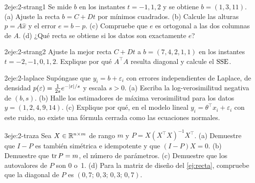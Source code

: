 \begin{ejercicio}{2}{eje:2-strang1}
Se mide $b$ en los instantes $t=-1,1,2$ y se obtiene $b=(1,3,11)$. (a) Ajuste la recta $b=C+Dt$ por mínimos cuadrados. (b) Calcule las alturas $p=A\hat x$ y el error $e=b-p$. (c) Compruebe que $e$ es ortogonal a las dos columnas de $A$. (d) ¿Qué recta se obtiene si los datos son exactamente $e$?
\end{ejercicio}

\begin{ejercicio}{2}{eje:2-strang2}
Ajuste la mejor recta $C+Dt$ a $b=(7,4,2,1,1)$ en los instantes $t=-2,-1,0,1,2$. Explique por qué $A^{\top}A$ resulta diagonal y calcule el $\operatorname{SSE}$.
\end{ejercicio}

\begin{ejercicio}{2}{eje:2-laplace}
Supóngase que $y_i=b+\varepsilon_i$ con errores independientes de Laplace, de densidad $p(\varepsilon)=\frac{1}{2s}e^{-\lvert\varepsilon\rvert/s}$ y escala $s>0$. (a) Escriba la log-verosimilitud negativa de $(b,s)$. (b) Halle los estimadores de máxima verosimilitud para los datos $y=(1,2,4,9,14)$. (c) Explique por qué, en el modelo lineal $y_i=\theta^{\top}x_i+\varepsilon_i$ con este ruido, no existe una fórmula cerrada como las ecuaciones normales.
\end{ejercicio}

\begin{ejercicio}{3}{eje:2-traza}
Sea $X\in\mathbb{R}^{n\times m}$ de rango $m$ y $P=X(X^{\top}X)^{-1}X^{\top}$. (a) Demuestre que $I-P$ es también simétrica e idempotente y que $(I-P)X=0$. (b) Demuestre que $\operatorname{tr} P=m$, el número de parámetros. (c) Demuestre que los autovalores de $P$ son 0 o~1. (d) Para la matriz de diseño del \cref{ej:recta}, compruebe que la diagonal de $P$ es $(0{,}7;\,0{,}3;\,0{,}3;\,0{,}7)$.
\end{ejercicio}
